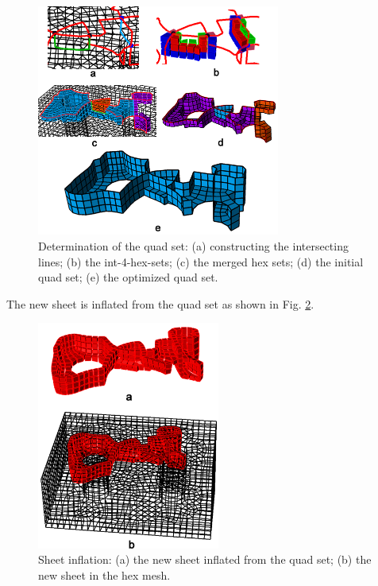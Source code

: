 \documentclass[final,5p,times,twocolumn]{elsarticle}
\begin{document}
\begin{figure}[htbp]
\begin{center}
\includegraphics[width=8cm]{figures/exam1_quad_set.png}
\caption{Determination of the quad set: (a) constructing the intersecting lines; (b) the int-4-hex-sets; (c) the merged hex sets; (d) the initial quad set; (e) the optimized quad set.}
\label{fig:exam1_quad_set}
\end{center}
\end{figure}

The new sheet is inflated from the quad set as shown in Fig. \ref{fig:exam1_sheet}.

\begin{figure}[htbp]
\begin{center}
\includegraphics[width=6cm]{figures/exam1_sheet.png}
\caption{Sheet inflation: (a) the new sheet inflated from the quad set; (b) the new sheet in the hex mesh.}
\label{fig:exam1_sheet}
\end{center}
\end{figure}

\end{document}
